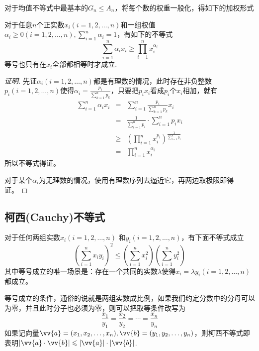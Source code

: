 对于均值不等式中最基本的$G_n\leqslant A_n$，将每个数的权重一般化，得如下的加权形式
\begin{theorem}[加权平均值不等式]
  对于任意$n$个正实数$x_{i}(i=1,2,\ldots,n)$和一组权值$\alpha_i\geqslant 0(i=1,2,\ldots,n),\sum_{i=1}^n\alpha_i=1$，有如下的不等式
  \begin{equation}
    \label{eq:mean-inequation-with-weight}
    \sum_{i=1}^n\alpha_ix_i \geqslant \prod_{i=1}^nx_i^{\alpha_i}
  \end{equation}
  等号也只有在$x_i$全部都相等时才成立.
\end{theorem}
\begin{proof}[证明]
  先证$\alpha_i(i=1,2,\ldots,n)$都是有理数的情况，此时存在非负整数$p_i(i=1,2,\ldots,n)$使得$\alpha_i=\frac{p_i}{\sum_{k=1}^np_k}$，只要把$p_ix_i$看成$p_i$个$x_i$相加，就有
  \begin{eqnarray*}
    \sum_{i=1}^n\alpha_ix_i &=& \sum_{i=1}^n \frac{p_i}{\sum_{k=1}^np_k}x_i \\
                            &=& \frac{1}{\sum_{i=1}^np_i} \cdot \sum_{i=1}^np_ix_i \\
                            & \geqslant & \left (\prod_{i=1}^nx_i^{p_i} \right)^{\frac{1}{\sum_{i=1}^n p_i}} \\
    & = & \prod_{i=1}^n x_i^{\alpha_i}
  \end{eqnarray*}
  所以不等式得证。

  对于某个$\alpha_i$为无理数的情况，使用有理数序列去逼近它，再两边取极限即得证。
\end{proof}

\subsection{柯西(Cauchy)不等式}
\label{sec:cauchy-schwarz-inequation}

\begin{theorem}[柯西不等式]
  对于任何两组实数$x_i(i=1,2,\ldots,n)$ 和$y_i(i=1,2,\ldots,n)$，有下面不等式成立
  \begin{equation}
    \label{eq:cauchy-inequation}
    \left( \sum_{i=1}^nx_iy_i \right)^{2} \leqslant \left( \sum_{i=1}^{n}x_i^2 \right) \left( \sum_{i=1}^ny_i^{2} \right)
  \end{equation}
  其中等号成立的唯一场景是：存在一个共同的实数$\lambda$使得$x_i=\lambda y_{i}(i=1,2,\ldots,n)$都成立。
\end{theorem}
等号成立的条件，通俗的说就是两组实数成比例，如果我们约定分数中的分母可以为零，并且此时分子也必须为零，则可以把取等条件改写为
\begin{equation*}
  \frac{x_1}{y_1} = \frac{x_2}{y_2} = \cdots = \frac{x_n}{y_n}
\end{equation*}
如果记向量$\vv{a}=(x_1,x_2,\ldots,x_n), \vv{b}=(y_1,y_2,\ldots,y_n)$，则柯西不等式即表明$|\vv{a} \cdot \vv{b}| \leqslant |\vv{a}| \cdot |\vv{b}|$.

